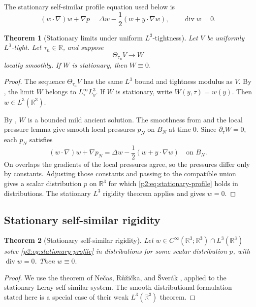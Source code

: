 \documentclass[11pt]{amsart}
\theoremstyle{plain}
\newtheorem{theorem}{Theorem}[section]
\theoremstyle{definition}
\theoremstyle{remark}
\numberwithin{equation}{section}
\newcommand{\R}{\mathbb R}
\newcommand{\divergence}{\operatorname{div}}
\begin{document}
The stationary self-similar profile equation used below is
\begin{equation}\label{p2:eq:stationary-profile}
   (w\cdot\nabla)w+\nabla p
   =
   \Delta w-\frac12(w+y\cdot\nabla w),
   \qquad \divergence w=0 .
\end{equation}

\begin{theorem}[Stationary limits under uniform \(L^3\)-tightness]
\label{p2:thm:stationary-limits-tight}
Let \(V\) be uniformly \(L^3\)-tight.  Let \(\tau_n\in\R\), and suppose
\[
   \Theta_{\tau_n}V\to W
\]
locally smoothly.  If \(W\) is stationary, then \(W\equiv0\).
\end{theorem}

\begin{proof}
The sequence \(\Theta_{\tau_n}V\) has the same \(L^3\) bound and tightness
modulus as \(V\).  By , the limit \(W\) belongs to
\(L^\infty_\tau L^3_y\).  If \(W\) is stationary, write
\(W(y,\tau)=w(y)\).  Then \(w\in L^3(\R^3)\).

By , \(W\) is a bounded mild ancient solution.  The
smoothness from  and the local pressure lemma
 give smooth local pressures \(p_N\) on \(B_N\) at
time \(0\).  Since
\(\partial_\tau W=0\), each \(p_N\) satisfies
\[
   (w\cdot\nabla)w+\nabla p_N
   =
   \Delta w-\frac12(w+y\cdot\nabla w)
   \quad\text{on }B_N .
\]
On overlaps the gradients of the local pressures agree, so the pressures
differ only by constants.  Adjusting those constants and passing to the
compatible union gives a scalar distribution \(p\) on \(\R^3\) for which
\eqref{p2:eq:stationary-profile} holds in distributions.  The stationary
\(L^3\) rigidity theorem  applies and gives \(w=0\).
\end{proof}

\subsection{Stationary self-similar rigidity}

\begin{theorem}[Stationary self-similar rigidity]\label{p2:thm:NRS}
Let \(w\in C^\infty(\R^3;\R^3)\cap L^3(\R^3)\) solve
\eqref{p2:eq:stationary-profile} in distributions for some scalar distribution
\(p\), with \(\divergence w=0\).  Then \(w\equiv0\).
\end{theorem}

\begin{proof}
We use the theorem of Ne\v{c}as, R\r{u}\v{z}i\v{c}ka, and
\v{S}ver\'ak \cite{NRS1996}, applied to the stationary Leray self-similar
system.  The smooth distributional formulation stated here is a special case
of their weak \(L^3(\R^3)\) theorem.
\end{proof}
\end{document}
